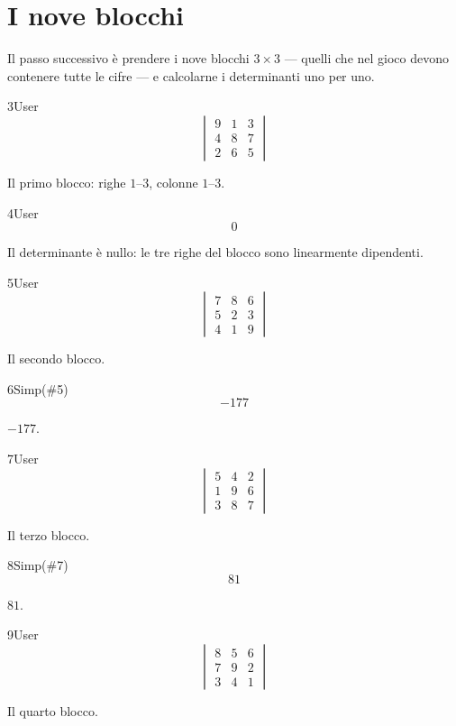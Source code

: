 \section{I nove blocchi}

Il passo successivo è prendere i nove blocchi $3\times3$ — quelli che nel gioco devono contenere tutte le cifre — e calcolarne i determinanti uno per uno.

\begin{espr}{3}{User}{}
\[
\begin{vmatrix} 9 & 1 & 3 \\ 4 & 8 & 7 \\ 2 & 6 & 5 \end{vmatrix}
\]
\end{espr}
Il primo blocco: righe $1$--$3$, colonne $1$--$3$.

\begin{espr}{4}{User}{}
\[
0
\]
\end{espr}
Il determinante è nullo: le tre righe del blocco sono linearmente dipendenti.

\begin{espr}{5}{User}{}
\[
\begin{vmatrix} 7 & 8 & 6 \\ 5 & 2 & 3 \\ 4 & 1 & 9 \end{vmatrix}
\]
\end{espr}
Il secondo blocco.

\begin{espr}{6}{Simp(\#5)}{}
\[
-177
\]
\end{espr}
$-177$.

\begin{espr}{7}{User}{}
\[
\begin{vmatrix} 5 & 4 & 2 \\ 1 & 9 & 6 \\ 3 & 8 & 7 \end{vmatrix}
\]
\end{espr}
Il terzo blocco.

\begin{espr}{8}{Simp(\#7)}{}
\[
81
\]
\end{espr}
$81$.

\begin{espr}{9}{User}{}
\[
\begin{vmatrix} 8 & 5 & 6 \\ 7 & 9 & 2 \\ 3 & 4 & 1 \end{vmatrix}
\]
\end{espr}
Il quarto blocco.

